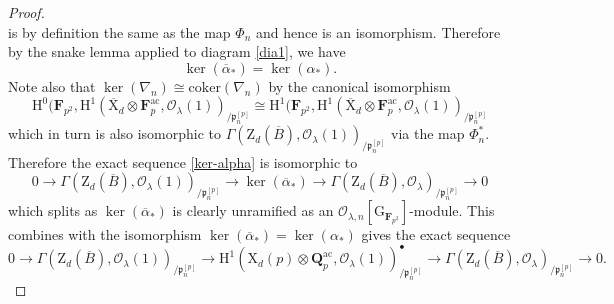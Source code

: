 \documentclass[10pt,a4paper]{amsart}
\def\FF{\mathbf{F}}
\def\QQ{\mathbf{Q}}
\def\ac{\mathrm{ac}}
\def\calO{\mathcal{O}}
\def\coker{\mathrm{coker}}
\def\frakp{\mathfrak{p}}
\def\rmG{\mathrm{G}}
\def\rmH{\mathrm{H}}
\def\rmX{\mathrm{X}}
\def\rmZ{\mathrm{Z}}
\begin{document}
\begin{proof}
\begin{equation*}
\end{equation*}
is by definition the same as the map $\Phi_{n}$ and hence is an isomorphism.
Therefore by the snake lemma applied to diagram \ref{dia1}, we have 
\begin{equation*}
\ker(\overline{\alpha}_{\ast})=\ker(\alpha_{\ast}).
\end{equation*} 
Note also that $ \ker(\nabla_{n})\cong \coker(\nabla_{n})$ by the canonical isomorphism 
\begin{equation*}
\rmH^{0}(\FF_{p^{2}}, \rmH^{1}(\overline{\rmX}_{d}\otimes{\FF^{\ac}_{p}}, \calO_{\lambda}(1))_{/\frakp^{[p]}_{n}}\cong \rmH^{1}(\FF_{p^{2}}, \rmH^{1}(\overline{\rmX}_{d}\otimes{\FF^{\ac}_{p}}, \calO_{\lambda}(1))_{/\frakp^{[p]}_{n}}
\end{equation*}
which in turn is also isomorphic to $\Gamma(\rmZ_{d}(\overline{B}), \calO_{\lambda}(1))_{/\frakp^{[p]}_{n}}$ via the map $\Phi^{\ast}_{n}$.
Therefore the exact sequence \ref{ker-alpha} is isomorphic to
 \begin{equation*}
0\rightarrow \Gamma(\rmZ_{d}(\overline{B}), \calO_{\lambda}(1))_{/\frakp^{[p]}_{n}}\rightarrow \ker(\overline{\alpha}_{\ast})\rightarrow \Gamma(\rmZ_{d}(\overline{B}), \calO_{\lambda})_{/\frakp^{[p]}_{n}}\rightarrow0
\end{equation*}
which splits as $\ker(\overline{\alpha}_{\ast})$ is clearly unramified as an $\calO_{\lambda, n}[\rmG_{\FF_{p^{2}}}]$-module. This combines with the isomorphism $\ker(\overline{\alpha}_{\ast})=\ker(\alpha_{\ast})$ gives the exact sequence
\begin{equation*}
0\rightarrow \Gamma(\rmZ_{d}(\overline{B}), \calO_{\lambda}(1))_{/\frakp^{[p]}_{n}}\rightarrow \rmH^{1}({\rmX}_{d}(p)\otimes {\QQ^{\ac}_{p}}, \calO_{\lambda}(1))^{\bullet}_{/\frakp^{[p]}_{n}}\rightarrow \Gamma(\rmZ_{d}(\overline{B}), \calO_{\lambda})_{/\frakp^{[p]}_{n}}\rightarrow0.
\end{equation*}


\end{proof}
\end{document}
